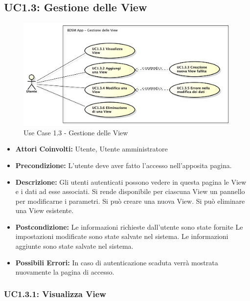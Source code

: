 \clearpage


\subsection{UC1.3: Gestione delle View}

\begin{figure}[!htbp]
    \centering
    \centerline{\includegraphics[scale=0.45]{./images/UC1_3.pdf}}
    \caption{Use Case 1.3 - Gestione delle View}
\end{figure}

\begin{itemize}
    \item \textbf{Attori Coinvolti:} Utente, Utente amministratore
    \item \textbf{Precondizione:} L’utente deve aver fatto l’accesso nell’apposita pagina.

    \item \textbf{Descrizione:} Gli utenti autenticati possono vedere in questa pagina le View e i dati ad esse associati.
    Si rende disponibile per ciascuna View un pannello per modificarne i parametri.
    Si può creare una nuova View.
    Si può eliminare una View esistente.

    \item \textbf{Postcondizione:}
    Le informazioni richieste dall'utente sono state fornite
    Le impostazioni modificate sono state salvate nel sistema.
    Le informazioni aggiunte sono state salvate nel sistema.

    \item \textbf{Possibili Errori:}
    In caso di autenticazione scaduta verrà mostrata nuovamente la pagina di accesso.
\end{itemize}

\subsubsection{UC1.3.1: Visualizza View}

